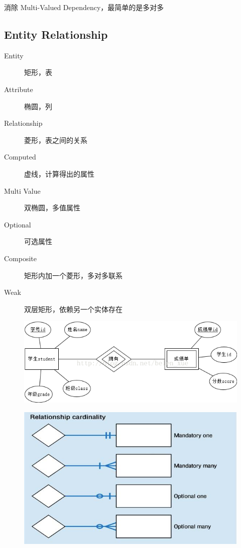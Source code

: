\documentclass[11pt,journal,compsoc]{IEEEtran}
\begin{document}
消除 Multi-Valued Dependency，最简单的是多对多


\subsection{Entity Relationship}

\begin{description}
    \item[Entity] 矩形，表
    \item[Attribute] 椭圆，列
    \item[Relationship] 菱形，表之间的关系
    \item[Computed] 虚线，计算得出的属性
    \item[Multi Value] 双椭圆，多值属性
    \item[Optional] 可选属性
    \item[Composite] 矩形内加一个菱形，多对多联系
    \item[Weak] 双层矩形，依赖另一个实体存在
\end{description}

\begin{figure}[H]
    \centering
    \includegraphics[width=\linewidth]{ER2.png}
\end{figure}

\begin{figure}[H]
    \centering
    \includegraphics[width=\linewidth]{ER.jpg}
\end{figure}
\end{document}
